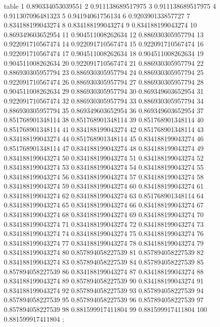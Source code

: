 table {%
	1 0.890334053039551
	2 0.911138689517975
	3 0.911138689517975
	4 0.911307096481323
	5 0.94194061756134
	6 0.920390133857727
	7 0.834188199043274
	8 0.834188199043274
	9 0.834188199043274
	10 0.869349603652954
	11 0.904511008262634
	12 0.886930305957794
	13 0.922091710567474
	14 0.922091710567474
	15 0.922091710567474
	16 0.922091710567474
	17 0.904511008262634
	18 0.904511008262634
	19 0.904511008262634
	20 0.922091710567474
	21 0.886930305957794
	22 0.886930305957794
	23 0.886930305957794
	24 0.886930305957794
	25 0.922091710567474
	26 0.886930305957794
	27 0.886930305957794
	28 0.904511008262634
	29 0.886930305957794
	30 0.869349603652954
	31 0.922091710567474
	32 0.886930305957794
	33 0.886930305957794
	34 0.886930305957794
	35 0.869349603652954
	36 0.869349603652954
	37 0.851768901348114
	38 0.851768901348114
	39 0.851768901348114
	40 0.851768901348114
	41 0.834188199043274
	42 0.851768901348114
	43 0.834188199043274
	44 0.851768901348114
	45 0.834188199043274
	46 0.851768901348114
	47 0.834188199043274
	48 0.834188199043274
	49 0.834188199043274
	50 0.834188199043274
	51 0.834188199043274
	52 0.834188199043274
	53 0.834188199043274
	54 0.834188199043274
	55 0.834188199043274
	56 0.834188199043274
	57 0.834188199043274
	58 0.834188199043274
	59 0.834188199043274
	60 0.834188199043274
	61 0.834188199043274
	62 0.834188199043274
	63 0.851768901348114
	64 0.834188199043274
	65 0.834188199043274
	66 0.834188199043274
	67 0.834188199043274
	68 0.834188199043274
	69 0.834188199043274
	70 0.834188199043274
	71 0.834188199043274
	72 0.834188199043274
	73 0.834188199043274
	74 0.834188199043274
	75 0.834188199043274
	76 0.834188199043274
	77 0.834188199043274
	78 0.834188199043274
	79 0.834188199043274
	80 0.857894058227539
	81 0.857894058227539
	82 0.834188199043274
	83 0.857894058227539
	84 0.857894058227539
	85 0.857894058227539
	86 0.834188199043274
	87 0.834188199043274
	88 0.834188199043274
	89 0.857894058227539
	90 0.834188199043274
	91 0.834188199043274
	92 0.857894058227539
	93 0.857894058227539
	94 0.857894058227539
	95 0.857894058227539
	96 0.857894058227539
	97 0.857894058227539
	98 0.881599917411804
	99 0.881599917411804
	100 0.881599917411804
};
